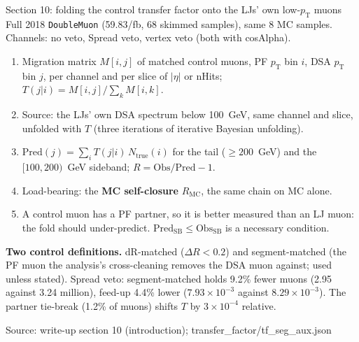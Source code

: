 \documentclass[aspectratio=169,10pt]{beamer}
\newcommand{\src}[1]{\par\vfill{\scriptsize\color{gray} Source: #1}}
\newcommand{\pt}{p_{\mathrm{T}}}
\begin{document}
\begin{frame}{Section 10: folding the control transfer factor onto the LJs' own low-\texorpdfstring{$\pt$}{pT} muons}
  \small
  Full 2018 \texttt{DoubleMuon} (59.83/fb, 68 skimmed samples), same 8 MC samples. Channels: no veto,
  Spread veto, vertex veto (both with cosAlpha).
  \begin{enumerate}
    \item Migration matrix $M[i,j]$ of matched control muons, PF $\pt$ bin $i$, DSA $\pt$ bin $j$,
          per channel and per slice of $|\eta|$ or nHits; $T(j|i) = M[i,j] / \sum_k M[i,k]$.
    \item Source: the LJs' own DSA spectrum below 100~GeV, same channel and slice, unfolded with $T$
          (three iterations of iterative Bayesian unfolding).
    \item $\mathrm{Pred}(j) = \sum_i T(j|i)\, N_{\mathrm{true}}(i)$ for the tail ($\geq 200$~GeV)
          and the $[100, 200)$~GeV sideband; $R = \mathrm{Obs}/\mathrm{Pred} - 1$.
    \item Load-bearing: the \textbf{MC self-closure} $R_{\mathrm{MC}}$, the same chain on MC alone.
    \item A control muon has a PF partner, so it is better measured than an LJ muon: the fold should
          under-predict. $\mathrm{Pred}_{\mathrm{SB}} \leq \mathrm{Obs}_{\mathrm{SB}}$ is a necessary condition.
  \end{enumerate}
  \textbf{Two control definitions.} dR-matched ($\Delta R < 0.2$) and segment-matched (the PF muon the
  analysis's cross-cleaning removes the DSA muon against; used unless stated). Spread veto:
  segment-matched holds 9.2\% fewer muons (2.95 against 3.24 million), feed-up 4.4\% lower
  ($7.93 \times 10^{-3}$ against $8.29 \times 10^{-3}$). The partner tie-break (1.2\% of muons)
  shifts $T$ by $3 \times 10^{-4}$ relative.
  \src{write-up section 10 (introduction); transfer\_factor/tf\_seg\_aux.json}
\end{frame}
\end{document}

